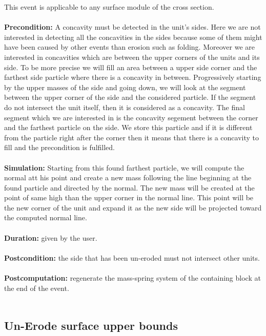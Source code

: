 \documentclass[12pt, a4paper]{report} %
\begin{document}
This event is applicable to any surface module of the cross section.\\\\
\textbf{Precondition:} A concavity must be detected in the unit's sides. Here we are not interested in detecting all the concavities in the sides because some of them might have been caused by other events than erosion such as folding. Moreover we are interested in concavities which are between the upper corners of the units and its side. To be more precise we will fill an area between a upper side corner and the farthest side particle where there is a concavity in between. Progressively starting by the upper masses of the side and going down, we will look at the segment between the upper corner of the side and the considered particle. If the segment do not intersect the unit itself, then it is considered as a concavity. The final segment which we are interested in is the concavity segement between the corner and the farthest particle on the side. We store this particle and if it is different from the particle right after the corner then it means that there is a concavity to fill and the precondition is fulfilled.\\\\
\textbf{Simulation:}  Starting from this found farthest particle, we will compute the normal att his point and create a new mass following the line beginning at the found particle and directed by the normal. The new mass will be created at the point of same high than the upper corner in the normal line. This point will be the new corner of the unit and expand it as the new side will be projected toward the computed normal line.\\\\
\textbf{Duration:} given by the user.\\\\
\textbf{Postcondition:} the side that has been un-eroded must not intersect other units.\\\\
\textbf{Postcomputation:} regenerate the mass-spring system of the containing block at the end of the event.\\\\

\subsection{Un-Erode surface upper bounds}
\end{document}
